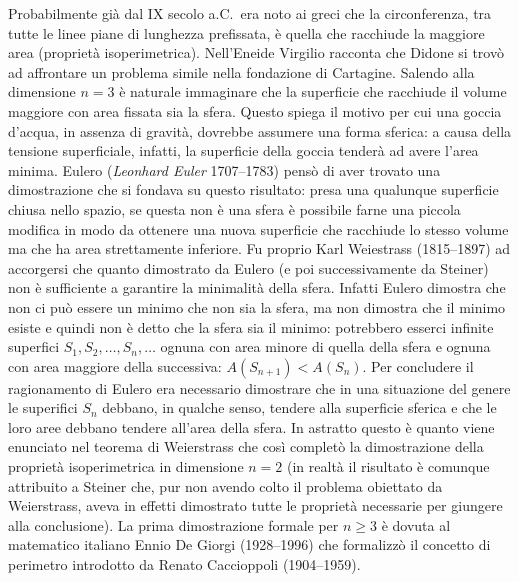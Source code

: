 \label{note:isoperimetrico}%
%
Probabilmente già dal IX secolo a.C.\ era noto ai greci che 
la circonferenza, tra tutte le linee piane di lunghezza prefissata, 
è quella che racchiude la maggiore area (proprietà isoperimetrica).
Nell'Eneide Virgilio racconta che Didone si trovò ad affrontare 
un problema simile nella fondazione di Cartagine.
%
%
%
%
Salendo alla dimensione $n=3$ è naturale immaginare che 
la superficie che racchiude il volume maggiore con area fissata 
sia la sfera. 
Questo spiega il motivo per cui una goccia d'acqua, in assenza di gravità,
dovrebbe assumere una forma sferica: a causa della tensione superficiale, 
infatti, la superficie della goccia tenderà ad avere l'area minima.
Eulero (\emph{Leonhard Euler} 1707--1783)
%
%
pensò di aver
trovato una dimostrazione
che si fondava su questo risultato:
presa una qualunque superficie chiusa nello spazio,
se questa non è una sfera è possibile
farne una piccola modifica in modo da ottenere una nuova superficie
che racchiude lo stesso volume ma che ha area strettamente inferiore.
Fu proprio Karl Weiestrass (1815--1897)
%
ad accorgersi che quanto dimostrato da Eulero 
(e poi successivamente da Steiner) 
non è sufficiente a garantire la minimalità della sfera. 
Infatti Eulero dimostra che non ci può essere un minimo che non sia la sfera, 
ma non dimostra che il minimo esiste e quindi non è detto che la sfera sia il minimo: 
potrebbero esserci infinite superfici $S_1, S_2, \dots, S_n, \dots$ 
ognuna con area minore di quella della sfera e ognuna con area maggiore della successiva: 
$A(S_{n+1})< A(S_n)$. 
Per concludere il ragionamento di Eulero era necessario dimostrare 
che in una situazione del genere le superifici $S_n$ debbano, in qualche senso, 
tendere alla superficie sferica e che le loro aree debbano
tendere all'area della sfera. 
In astratto questo è quanto viene enunciato nel teorema di Weierstrass 
che così completò la dimostrazione della proprietà isoperimetrica
in dimensione $n=2$ (in realtà il risultato è comunque attribuito a Steiner che,
pur non avendo colto il problema obiettato da Weierstrass, aveva in effetti 
dimostrato tutte le proprietà necessarie per giungere alla conclusione).
La prima dimostrazione formale per $n\ge 3$ 
è dovuta al matematico italiano Ennio De Giorgi (1928--1996)
%
che formalizzò il concetto di perimetro introdotto
da Renato Caccioppoli (1904--1959).%
%
%
